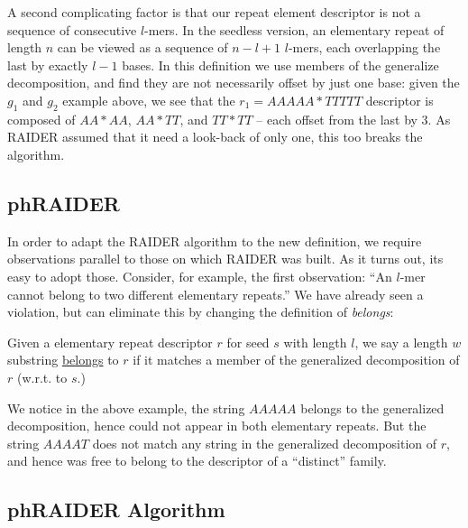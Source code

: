 \documentclass{bmcart}
\begin{document}
A second complicating factor is that our repeat element descriptor is
not a sequence of consecutive $l$-mers. In the seedless version, an
elementary repeat of length $n$ can be viewed as a sequence of $n-l+1$
$l$-mers, each overlapping the last by exactly $l-1$ bases. In this
definition we use members of the generalize decomposition, and find
they are not necessarily offset by just one base: given the $g_1$ and
$g_2$ example above, we see that the $r_1 = AAAAA*TTTTT$ descriptor is
composed of $AA*AA$, $AA*TT$, and $TT*TT$ -- each offset from the last
by 3.  As RAIDER assumed that it need a look-back of only one, this
too breaks the algorithm.

\subsection*{phRAIDER}

In order to adapt the RAIDER algorithm to the new definition, we
require observations parallel to those on which RAIDER was built.  As
it turns out, its easy to adopt those.  Consider, for example, the
first observation: ``An $l$-mer cannot belong to two different
elementary repeats.''  We have already seen a violation, but can
eliminate this by changing the definition of {\it belongs}:
\begin{definition}
  Given a elementary repeat descriptor $r$ for seed $s$ with length
  $l$, we say a length $w$ substring \underline{belongs} to $r$ if it
  matches a member of the generalized decomposition of $r$ (w.r.t. to
  $s$.)
\end{definition}
We notice in the above example, the string $AAAAA$ belongs to the
generalized decomposition, hence could not appear in both elementary
repeats.  But the string $AAAAT$ does not match any string in the
generalized decomposition of $r$, and hence was free to belong to
the descriptor of a ``distinct'' family.

\subsection*{phRAIDER Algorithm}



  
    









\end{document}
